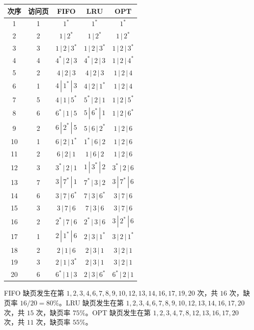 \begin{enumerate}[start=7]
\begin{center}
\small
\begin{tabular}{|c|c|c|c|c|}
\hline
次序 & 访问页 & FIFO & LRU & OPT \\
\hline
1 & 1 & $1^*$ & $1^*$ & $1^*$ \\
2 & 2 & $1\,|\,2^*$ & $1\,|\,2^*$ & $1\,|\,2^*$ \\
3 & 3 & $1\,|\,2\,|\,3^*$ & $1\,|\,2\,|\,3^*$ & $1\,|\,2\,|\,3^*$ \\
4 & 4 & $4^*\,|\,2\,|\,3$ & $4^*\,|\,2\,|\,3$ & $1\,|\,2\,|\,4^*$ \\
5 & 2 & $4\,|\,2\,|\,3$ & $4\,|\,2\,|\,3$ & $1\,|\,2\,|\,4$ \\
6 & 1 & $4\,|\,1^*\,|\,3$ & $4\,|\,2\,|\,1^*$ & $1\,|\,2\,|\,4$ \\
7 & 5 & $4\,|\,1\,|\,5^*$ & $5^*\,|\,2\,|\,1$ & $1\,|\,2\,|\,5^*$ \\
8 & 6 & $6^*\,|\,1\,|\,5$ & $5\,|\,6^*\,|\,1$ & $1\,|\,2\,|\,6^*$ \\
9 & 2 & $6\,|\,2^*\,|\,5$ & $5\,|\,6\,|\,2^*$ & $1\,|\,2\,|\,6$ \\
10 & 1 & $6\,|\,2\,|\,1^*$ & $1^*\,|\,6\,|\,2$ & $1\,|\,2\,|\,6$ \\
11 & 2 & $6\,|\,2\,|\,1$ & $1\,|\,6\,|\,2$ & $1\,|\,2\,|\,6$ \\
12 & 3 & $3^*\,|\,2\,|\,1$ & $1\,|\,3^*\,|\,2$ & $3^*\,|\,2\,|\,6$ \\
13 & 7 & $3\,|\,7^*\,|\,1$ & $7^*\,|\,3\,|\,2$ & $3\,|\,7^*\,|\,6$ \\
14 & 6 & $3\,|\,7\,|\,6^*$ & $7\,|\,3\,|\,6^*$ & $3\,|\,7\,|\,6$ \\
15 & 3 & $3\,|\,7\,|\,6$ & $7\,|\,3\,|\,6$ & $3\,|\,7\,|\,6$ \\
16 & 2 & $2^*\,|\,7\,|\,6$ & $2^*\,|\,3\,|\,6$ & $3\,|\,2^*\,|\,6$ \\
17 & 1 & $2\,|\,1^*\,|\,6$ & $2\,|\,3\,|\,1^*$ & $3\,|\,2\,|\,1^*$ \\
18 & 2 & $2\,|\,1\,|\,6$ & $2\,|\,3\,|\,1$ & $3\,|\,2\,|\,1$ \\
19 & 3 & $2\,|\,1\,|\,3^*$ & $2\,|\,3\,|\,1$ & $3\,|\,2\,|\,1$ \\
20 & 6 & $6^*\,|\,1\,|\,3$ & $2\,|\,3\,|\,6^*$ & $6^*\,|\,2\,|\,1$ \\
\hline
\end{tabular}
\end{center}

FIFO 缺页发生在第 $1,2,3,4,6,7,8,9,10,12,13,14,16,17,19,20$ 次，共 $16$ 次，缺页率 $16/20=80\%$。LRU 缺页发生在第 $1,2,3,4,6,7,8,9,10,12,13,14,16,17,20$ 次，共 $15$ 次，缺页率 $75\%$。OPT 缺页发生在第 $1,2,3,4,7,8,12,13,16,17,20$ 次，共 $11$ 次，缺页率 $55\%$。


\end{enumerate}
